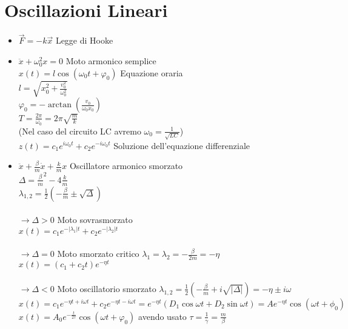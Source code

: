\documentclass[a4paper]{article}
\begin{document}
\section{Oscillazioni Lineari}
	\begin{itemize}
		\item $\overrightarrow{F} = -k \overrightarrow{x}$ Legge di Hooke
		\item $\ddot{x} + \omega_0^2 x = 0 $ Moto armonico semplice\\
		$x(t) = l \cos (\omega_0 t + \varphi_0)$ Equazione oraria\\
		$l = \sqrt{x_0^2 + \frac{v_0^2}{\omega_0^2}} $\\
		$\varphi_0 = -\arctan(\frac{v_0}{\omega_0 x_0})$ \\
		$T = \frac{2 \pi}{\omega_0} = 2 \pi \sqrt{\frac{m}{k}}$\\
		(Nel caso del circuito LC avremo $\omega_0 = \frac{1}{\sqrt{LC}}$)\\
		$z(t)=c_1 e^{i \omega_0 t }+ c_2 e^{-i \omega_0 t}$ Soluzione dell'equazione differenziale
		\item $\ddot{x} + \frac{\beta}{m} \dot{x} + \frac{k}{m}x$ Oscillatore armonico smorzato\\ %
		$\Delta = \frac{\beta}{m}^2-4\frac{k}{m}$\\
		$\lambda_{1,2}=\frac{1}{2}(-\frac{\beta}{m}\pm \sqrt{\Delta})$\\ \\
		$\rightarrow \Delta > 0$ Moto sovrasmorzato\\
		$x(t)=c_1e^{-|\lambda_1|t}+c_2e^{-|\lambda_2|t}$\\ \\
		$\rightarrow \Delta=0$ Moto smorzato critico $\lambda_1=\lambda_2=-\frac{\beta}{2m}= -\eta$\\
		$x(t)=(c_1+c_2t)e^{-\eta t}$\\ \\
		$\rightarrow \Delta <0$ Moto oscillatorio smorzato $\lambda_{1,2}=\frac{1}{2}(-\frac{\beta}{m}+i\sqrt{|\Delta|})=-\eta \pm i \omega$\\
		$x(t)=c_1e^{-\eta t+i \omega t}+c_2e^{-\eta t-i \omega t}=e^{-\eta t}(D_1 \cos \omega t + D_2 \sin \omega t)=Ae^{-\eta t} \cos(\omega t + \phi_0)$\\
		$x(t)=A_0e^{-\frac{t}{2 \tau}} \cos(\omega t + \varphi_0)$ avendo usato $\tau = \frac{1}{\gamma}=\frac{m}{\beta}$

\end{itemize}
\end{document}
